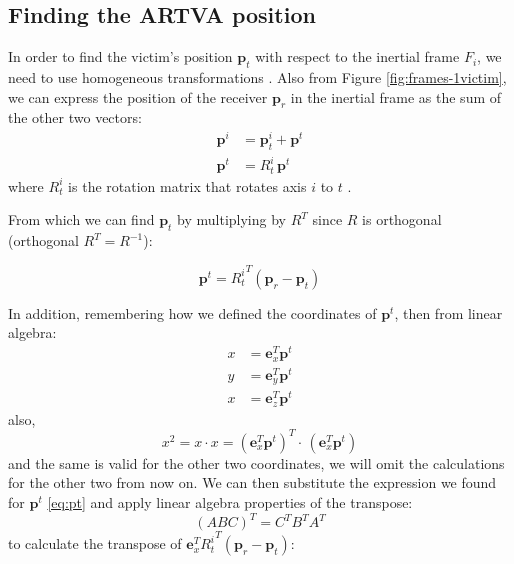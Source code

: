 \subsection{Finding the ARTVA position}
In order to find the victim's position $\mathbf{p}_t$ with respect to the inertial frame $F_i$, we need to use homogeneous transformations \cite{book-robotics}. 
Also from Figure \ref{fig:frames-1victim}, we can express the position of the receiver $\mathbf{p}_r$ in the inertial frame as the sum of the other two vectors:
\[
\begin{aligned}
\mathbf{p}^i &= \mathbf{p}_t^i + \mathbf{p}^t \\
\mathbf{p}^t &= R_t^i \, \mathbf{p}^t
\end{aligned}
\]
where $R_t^i$ is the rotation matrix that rotates axis $i$ to $t$ \cite{artva-gazebo}.

From which we can find $\mathbf{p}_t$ by multiplying by $R^T$ since $R$ is orthogonal (orthogonal $R^T = R^{-1}$):

\begin{equation}
    \mathbf{p}^t = {R_t^i}^T (\mathbf{p}_r - \mathbf{p}_t)
    \label{eq:pt}
\end{equation}

In addition, remembering how we defined the coordinates of $\mathbf{p}^t$, then from linear algebra:
\[
\begin{aligned}
x &= \mathbf{e}_x^T \mathbf{p}^t \\
y &= \mathbf{e}_y^T \mathbf{p}^t \\
x  &= \mathbf{e}_z^T \mathbf{p}^t
\end{aligned}
\]
also,
\[
x^2 = x \cdot x = \left( \mathbf{e}_x^T \mathbf{p}^t \right)^T \cdot \, \left( \mathbf{e}_x^T \mathbf{p}^t \right)
\]
and the same is valid for the other two coordinates, we will omit the calculations for the other two from now on. 
We can then substitute the expression we found for $\mathbf{p}^t$ \ref{eq:pt} and apply linear algebra properties of the transpose:
$$(ABC)^T = C^T B^T A^T$$ to calculate the transpose of $\mathbf{e}_x^T {R_t^i}^T (\mathbf{p}_r - \mathbf{p}_t)$:

